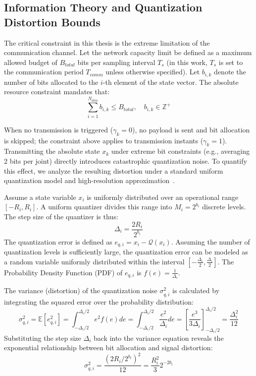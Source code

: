 \subsection{Information Theory and Quantization Distortion Bounds}

The critical constraint in this thesis is the extreme limitation of the communication channel. Let the network capacity limit be defined as a maximum allowed budget of $B_{total}$ bits per sampling interval $T_s$ (in this work, $T_s$ is set to the communication period $T_{comm}$ unless otherwise specified). Let $b_{i,k}$ denote the number of bits allocated to the $i$-th element of the state vector. The absolute resource constraint mandates that:
\begin{equation}
    \sum_{i=1}^{N_{dim}} b_{i,k} \le B_{total}, \quad b_{i,k} \in \mathbb{Z}^+
\end{equation}

When no transmission is triggered ($\gamma_k=0$), no payload is sent and bit allocation is skipped; the constraint above applies to transmission instants ($\gamma_k=1$). Transmitting the absolute state $x_k$ under extreme bit constraints (e.g., averaging 2 bits per joint) directly introduces catastrophic quantization noise. To quantify this effect, we analyze the resulting distortion under a standard uniform quantization model and high-resolution approximation~\cite{FCUDRC,CONFRC}.

Assume a state variable $x_i$ is uniformly distributed over an operational range $[-R_i, R_i]$. A uniform quantizer divides this range into $M_i = 2^{b_i}$ discrete levels. The step size of the quantizer is thus:
\begin{equation}
    \Delta_i = \frac{2R_i}{2^{b_i}}
\end{equation}
The quantization error is defined as $e_{q,i} = x_i - \mathcal{Q}(x_i)$. Assuming the number of quantization levels is sufficiently large, the quantization error can be modeled as a random variable uniformly distributed within the interval $[-\frac{\Delta_i}{2}, \frac{\Delta_i}{2}]$. The Probability Density Function (PDF) of $e_{q,i}$ is $f(e) = \frac{1}{\Delta_i}$.

The variance (distortion) of the quantization noise $\sigma_{q,i}^2$ is calculated by integrating the squared error over the probability distribution:
\begin{equation}
    \sigma_{q,i}^2 = \mathbb{E}[e_{q,i}^2] = \int_{-\Delta_i/2}^{\Delta_i/2} e^2 f(e) de = \int_{-\Delta_i/2}^{\Delta_i/2} \frac{e^2}{\Delta_i} de = \left[ \frac{e^3}{3\Delta_i} \right]_{-\Delta_i/2}^{\Delta_i/2} = \frac{\Delta_i^2}{12}
\end{equation}
Substituting the step size $\Delta_i$ back into the variance equation reveals the exponential relationship between bit allocation and signal distortion:
\begin{equation}
    \sigma_{q,i}^2 = \frac{(2R_i/2^{b_i})^2}{12} = \frac{R_i^2}{3} 2^{-2b_i}
\end{equation}

